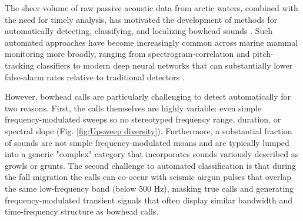 \documentclass[preprint,NumberedRefs]{JASAnew}
\begin{document}



The sheer volume of raw passive acoustic data from arctic waters, combined with the
need for timely analysis, has motivated the development of methods for automatically
detecting, classifying, and localizing bowhead sounds \cite{thode2012automated}. Such automated approaches have become increasingly
common across marine mammal monitoring more broadly, ranging from spectrogram-correlation
and pitch-tracking classifiers \cite{mellinger2000bowhead, baumgartner2011generalized}
to modern deep neural networks that can substantially lower false-alarm rates relative
to traditional detectors \cite{shiu2020deep, allen2021convolutional}.

However, bowhead calls are particularly challenging to detect automatically
for two reasons. First, the calls themselves are highly variable: even simple frequency-modulated sweeps so no stereotyped frequency range, duration, or spectral slope (Fig. \ref{fig:Upsweep diversity}). Furthermore, a substantial fraction of sounds are not simple frequency-modulated moans and are typically lumped into a generic "complex" category
\cite{clark1984sounds, stafford2021acoustic} that incorporates sounds variously described as growls or grunts. The second challenge to automated classification is that during the fall migration the calls
can co-occur with seismic airgun pulses that overlap the same low-frequency band
(below 500 Hz), masking true calls and generating frequency-modulated transient signals that often display similar bandwidth and time-frequency structure as bowhead calls\cite{blackwell2015effects, thode2012automated}.
\end{document}
